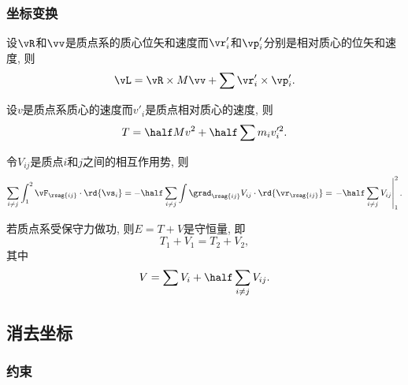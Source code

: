 \documentclass[../TheoreticalMechanics.tex]{subfiles}
\begin{document}

\subsubsection{坐标变换} %
\label{ssub:坐标变换}

\begin{finale}
	\begin{corollary}[角动量的坐标变换]
		设$\vR$和$\vv$是质点系的质心位矢和速度而$\vr'_i$和$\vp'_i$分别是相对质心的位矢和速度, 则
		\[ \vL = \vR \times M\vv + \sum \vr'_i \times \vp'_i. \]
	\end{corollary}
	\begin{corollary}[动能的坐标变换]
		设$v$是质点系质心的速度而$v'_i$是质点相对质心的速度, 则
		\[ T = \half Mv^2 + \half \sum m_i v'^2_i. \]
	\end{corollary}
\end{finale}
\begin{lemma}[质点间相互作用势能之和]
	令$V_{ij}$是质点$i$和$j$之间的相互作用势, 则
	\[ \sum_{i\neq j} \int_1^2 \vF_{\rsag{ij}}\cdot\rd{\vs_i} = -\half \sum_{i\neq j} \int \grad_{\rsag{ij}}V_{ij}\cdot\rd{\vr_{\rsag{ij}}} = \left.-\half \sum_{i\neq j}V_{ij}\right\vert_1^2. \]
\end{lemma}
\begin{corollary}[质点系的机械能守恒]
	若质点系受保守力做功, 则$E=T+V$是守恒量, 即
	\[ T_1 + V_1 = T_2 + V_2, \]
	其中
	\[ V = \sum V_i + \half \sum_{i\neq j} V_{ij}. \]
\end{corollary}



\subsection{消去坐标} %
\label{sub:消去坐标}

\subsubsection{约束} %
\label{ssub:约束}
\end{document}

